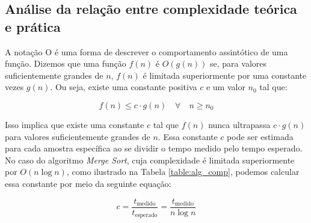 \documentclass[12pt]{article}
\begin{document}


\subsection{Análise da relação entre complexidade teórica e prática}

A notação O é uma forma de descrever o comportamento assintótico de uma função.  Dizemos que uma função $f(n)$ é $O(g(n))$ se, para valores suficientemente grandes de $n$, $f(n)$ é limitada superiormente por uma constante vezes $g(n)$. Ou seja, existe uma constante positiva $c$ e um valor $n_0$ tal que:

$$
f(n) \leq c \cdot g(n) \quad \forall \quad n \geq n_0
$$

Isso implica que existe uma constante $c$ tal que $f(n)$ nunca ultrapassa $c \cdot g(n)$ para valores suficientemente grandes de $n$. Essa constante $c$ pode ser estimada para cada amostra específica ao se dividir o tempo medido pelo tempo esperado. No caso do algoritmo \textit{Merge Sort}, cuja complexidade é limitada superiormente por $O(n \log n)$, como ilustrado na Tabela \ref{table:alg_comp}, podemos calcular essa constante por meio da seguinte equação:

\begin{equation}
\label{eq:constant}
    c = \frac{t_{\text{medido}}}{t_{\text{esperado}}} = \frac{t_{\text{medido}}}{n\log{n}}
\end{equation}
\end{document}
